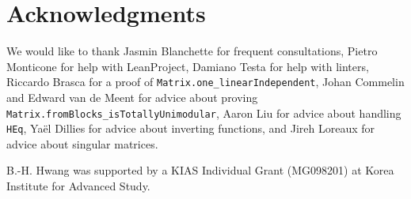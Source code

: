 \section{Acknowledgments}

We would like to thank
Jasmin Blanchette for frequent consultations,
Pietro Monticone for help with LeanProject,
Damiano Testa for help with linters,
Riccardo Brasca for a proof of \texttt{Matrix.one\_linearIndependent},
Johan Commelin and Edward van de Meent for advice about proving \texttt{Matrix.fromBlocks\_isTotallyUnimodular},
Aaron Liu for advice about handling \texttt{HEq},
Yaël Dillies for advice about inverting functions,
and Jireh Loreaux for advice about singular matrices.

B.-H. Hwang was supported by a KIAS Individual Grant (MG098201) at Korea Institute for Advanced Study.
